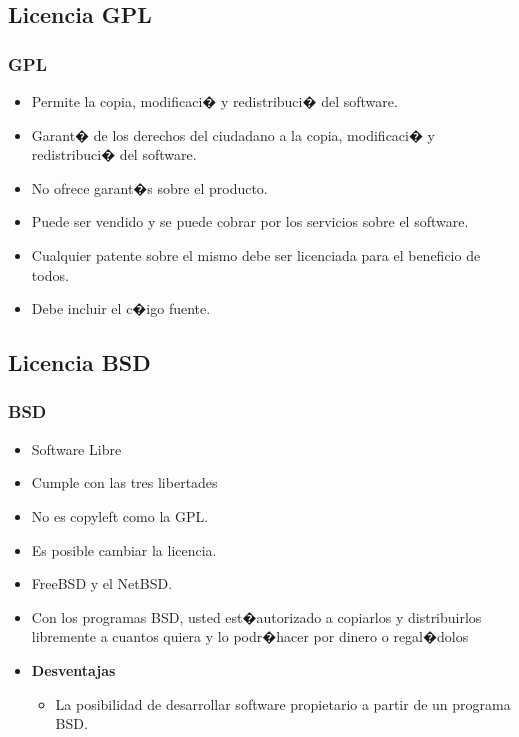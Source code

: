 \subsection{Licencia GPL}
\frame
{	
	\frametitle{GPL}
	\begin{itemize}
	\item Permite la copia, modificaci� y redistribuci� del software.
	\item Garant� de los derechos del ciudadano a la copia, modificaci� y redistribuci� del software.
	\item No ofrece garant�s sobre el producto.
	\item Puede ser vendido y se puede cobrar por los servicios sobre el software.
	\item Cualquier patente sobre el mismo debe ser licenciada para el beneficio de todos.
	\item Debe incluir el c�igo fuente.
	\end{itemize}
}
\subsection{Licencia BSD}
\frame	
{
	\frametitle{BSD}
        \begin{itemize}
        \item Software Libre
        \item Cumple con las tres libertades
        \item No es copyleft como la GPL.
        \item Es posible cambiar la licencia.
        \item FreeBSD y el NetBSD.                                                                  
	\item Con los programas BSD, usted est�autorizado a copiarlos y distribuirlos libremente a cuantos quiera y lo podr�hacer por dinero o regal�dolos
        \item \textbf{Desventajas}
		\begin{itemize}
		\item La posibilidad de desarrollar software propietario a partir de un programa BSD.
		\end{itemize}
	\end{itemize}
	
}
